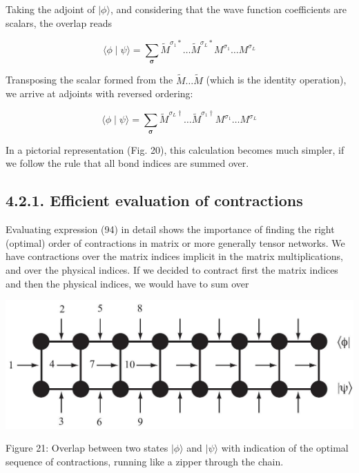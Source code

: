 \documentclass[12pt]{article}
\begin{document}
Taking the adjoint of $|\phi\rangle$, and considering that the wave function coefficients are scalars, the overlap reads


\begin{equation*}
\langle\phi \mid \psi\rangle=\sum_{\boldsymbol{\sigma}} \tilde{M}^{\sigma_{1} *} \ldots \tilde{M}^{\sigma_{L} *} M^{\sigma_{1}} \ldots M^{\sigma_{L}} \tag{93}
\end{equation*}


Transposing the scalar formed from the $\tilde{M} \ldots \tilde{M}$ (which is the identity operation), we arrive at adjoints with reversed ordering:


\begin{equation*}
\langle\phi \mid \psi\rangle=\sum_{\boldsymbol{\sigma}} \tilde{M}^{\sigma_{L} \dagger} \ldots \tilde{M}^{\sigma_{1} \dagger} M^{\sigma_{1}} \ldots M^{\sigma_{L}} \tag{94}
\end{equation*}


In a pictorial representation (Fig. 20), this calculation becomes much simpler, if we follow the rule that all bond indices are summed over.

\subsection*{4.2.1. Efficient evaluation of contractions}
Evaluating expression (94) in detail shows the importance of finding the right (optimal) order of contractions in matrix or more generally tensor networks. We have contractions over the matrix indices implicit in the matrix multiplications, and over the physical indices. If we decided to contract first the matrix indices and then the physical indices, we would have to sum over

\begin{center}
\includegraphics[max width=\textwidth]{2024_05_04_afc4ad226da9ccfe0ac8g-035}
\end{center}

Figure 21: Overlap between two states $|\phi\rangle$ and $|\psi\rangle$ with indication of the optimal sequence of contractions, running like a zipper through the chain.
\end{document}
